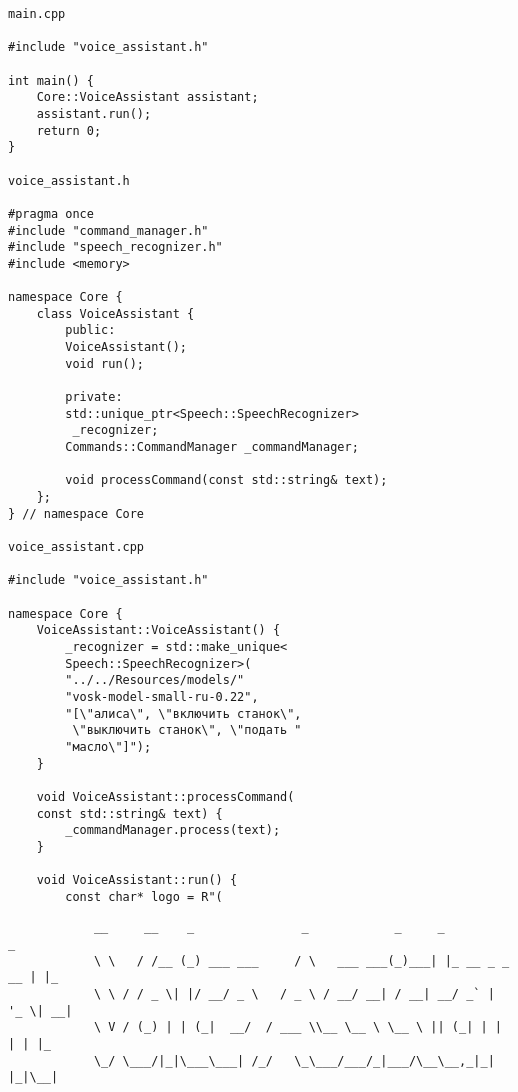 \begin{verbatim}
main.cpp
	
#include "voice_assistant.h"

int main() {
	Core::VoiceAssistant assistant;
	assistant.run();
	return 0;
}

voice_assistant.h

#pragma once
#include "command_manager.h"
#include "speech_recognizer.h"
#include <memory>

namespace Core {
	class VoiceAssistant {
		public:
		VoiceAssistant();
		void run();
		
		private:
		std::unique_ptr<Speech::SpeechRecognizer>
		 _recognizer;
		Commands::CommandManager _commandManager;
		
		void processCommand(const std::string& text);
	};
} // namespace Core

voice_assistant.cpp

#include "voice_assistant.h"

namespace Core {
	VoiceAssistant::VoiceAssistant() {
		_recognizer = std::make_unique<
		Speech::SpeechRecognizer>(
		"../../Resources/models/"
		"vosk-model-small-ru-0.22",
		"[\"алиса\", \"включить станок\",
		 \"выключить станок\", \"подать "
		"масло\"]");
	}
	
	void VoiceAssistant::processCommand(
	const std::string& text) {
		_commandManager.process(text);
	}
	
	void VoiceAssistant::run() {
		const char* logo = R"(
	\end{verbatim}
	{\tiny  %
		\begin{verbatim}
			__     __    _               _            _     _              _   
			\ \   / /__ (_) ___ ___     / \   ___ ___(_)___| |_ __ _ _ __ | |_ 
			\ \ / / _ \| |/ __/ _ \   / _ \ / __/ __| / __| __/ _` | '_ \| __|
			\ V / (_) | | (_|  __/  / ___ \\__ \__ \ \__ \ || (_| | | | | |_ 
			\_/ \___/|_|\___\___| /_/   \_\___/___/_|___/\__\__,_|_| |_|\__|
		\end{verbatim}
	}
